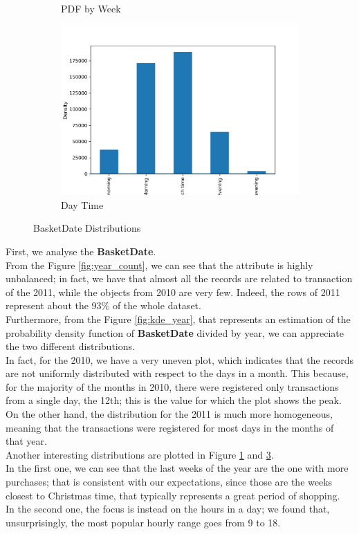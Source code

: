 \begin{figure}[!h]
\begin{subfigure}{.5\textwidth}
\caption{PDF by Week}
\label{fig:week_kde}
\end{subfigure}
\begin{subfigure}{.5\textwidth}
\centering
\includegraphics[width=.7\textwidth]{img/daytime_bar.png}
\caption{Day Time}
\label{fig:daytime_bar}
\end{subfigure}
\caption{BasketDate Distributions}
\end{figure}

First, we analyse the \textbf{BasketDate}.\\
From the Figure \ref{fig:year_count}, we can see that the attribute is highly unbalanced; in fact, we have that almost all the records are related to transaction of the 2011, while the objects from 2010 are very few.
Indeed, the rows of 2011 represent about the 93\% of the whole dataset.\\
Furthermore, from the Figure \ref{fig:kde_year}, that represents an estimation of the probability density function of \textbf{BasketDate} divided by year, we can appreciate the two different distributions.\\
In fact, for the 2010, we have a very uneven plot, which indicates that the records are not uniformly distributed with respect to the days in a month. This because, for the majority of the months in 2010, there were registered only transactions from a single day, the 12th; this is the value for which the plot shows the peak.\\
On the other hand, the distribution for the 2011 is much more homogeneous, meaning that the transactions were registered for most days in the months of that year.\\
Another interesting distributions are plotted in Figure \ref{fig:week_kde} and \ref{fig:daytime_bar}.\\
In the first one, we can see that the last weeks of the year are the one with more purchases; that is consistent with our expectations, since those are the weeks closest to Christmas time, that typically represents a great period of shopping.\\	
In the second one, the focus is instead on the hours in a day; we found that, unsurprisingly, the most popular hourly range goes from 9 to 18.

